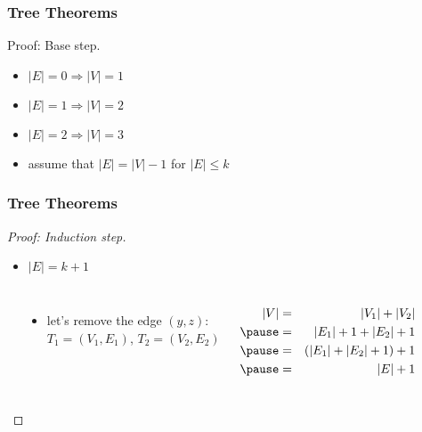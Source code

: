 \documentclass[dvipsnames]{beamer}
\begin{document}
\begin{frame}
  \frametitle{Tree Theorems}

  \begin{block}{Proof: Base step.}
    \begin{itemize}
      \item $|E|=0 \Rightarrow |V|=1$
      \item $|E|=1 \Rightarrow |V|=2$
      \item $|E|=2 \Rightarrow |V|=3$

      \pause
      \medskip
      \item assume that $|E| = |V| - 1$ for $|E| \leq k$
    \end{itemize}
  \end{block}
\end{frame}

\begin{frame}
  \frametitle{Tree Theorems}

  \begin{proof}[Proof: Induction step]
    \begin{itemize}
      \item $|E|=k+1$
    \end{itemize}

    \begin{columns}[t]
      \begin{center}
      \end{center}

      \pause
      \begin{itemize}
        \item let's remove the edge $(y,z)$:\\
          $T_1=(V_1,E_1)$, $T_2=(V_2,E_2)$
      \end{itemize}
      \pause
      \begin{eqnarray*}
        |V| & = & |V_1|+|V_2|\\\pause
            & = & |E_1|+1+|E_2|+1\\\pause
            & = & (|E_1|+|E_2|+1)+1\\\pause
            & = & |E|+1
      \end{eqnarray*}
    \end{columns}
  \end{proof}
\end{frame}
\end{document}

